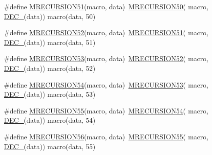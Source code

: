 \begin{DoxyCompactItemize}
\item 
\#define \mbox{\hyperlink{group__group__sam0__utils__mrecursion_ga6e7ba2940484a6723ca0f5a6c844ba89}{M\+R\+E\+C\+U\+R\+S\+I\+O\+N51}}(macro,  data)~\mbox{\hyperlink{group__group__sam0__utils__mrecursion_gadda406cbee1fde1ebddb8671c858981c}{M\+R\+E\+C\+U\+R\+S\+I\+O\+N50}}(  macro, \mbox{\hyperlink{group__group__sam0__utils__mrecursion_ga1d23d683797679dca8c3512a54a5dcae}{D\+E\+C\+\_\+}}(data))   macro(data, 50)
\item 
\#define \mbox{\hyperlink{group__group__sam0__utils__mrecursion_ga168834cb335f274f04d497f16f7b3289}{M\+R\+E\+C\+U\+R\+S\+I\+O\+N52}}(macro,  data)~\mbox{\hyperlink{group__group__sam0__utils__mrecursion_ga6e7ba2940484a6723ca0f5a6c844ba89}{M\+R\+E\+C\+U\+R\+S\+I\+O\+N51}}(  macro, \mbox{\hyperlink{group__group__sam0__utils__mrecursion_ga1d23d683797679dca8c3512a54a5dcae}{D\+E\+C\+\_\+}}(data))   macro(data, 51)
\item 
\#define \mbox{\hyperlink{group__group__sam0__utils__mrecursion_ga3ae2341c96ce8ddf34769207f469c5e6}{M\+R\+E\+C\+U\+R\+S\+I\+O\+N53}}(macro,  data)~\mbox{\hyperlink{group__group__sam0__utils__mrecursion_ga168834cb335f274f04d497f16f7b3289}{M\+R\+E\+C\+U\+R\+S\+I\+O\+N52}}(  macro, \mbox{\hyperlink{group__group__sam0__utils__mrecursion_ga1d23d683797679dca8c3512a54a5dcae}{D\+E\+C\+\_\+}}(data))   macro(data, 52)
\item 
\#define \mbox{\hyperlink{group__group__sam0__utils__mrecursion_ga1b859acc9e5724f34b432b236b8fd422}{M\+R\+E\+C\+U\+R\+S\+I\+O\+N54}}(macro,  data)~\mbox{\hyperlink{group__group__sam0__utils__mrecursion_ga3ae2341c96ce8ddf34769207f469c5e6}{M\+R\+E\+C\+U\+R\+S\+I\+O\+N53}}(  macro, \mbox{\hyperlink{group__group__sam0__utils__mrecursion_ga1d23d683797679dca8c3512a54a5dcae}{D\+E\+C\+\_\+}}(data))   macro(data, 53)
\item 
\#define \mbox{\hyperlink{group__group__sam0__utils__mrecursion_ga9ebaa5b7ac45c089517951e6978ee88a}{M\+R\+E\+C\+U\+R\+S\+I\+O\+N55}}(macro,  data)~\mbox{\hyperlink{group__group__sam0__utils__mrecursion_ga1b859acc9e5724f34b432b236b8fd422}{M\+R\+E\+C\+U\+R\+S\+I\+O\+N54}}(  macro, \mbox{\hyperlink{group__group__sam0__utils__mrecursion_ga1d23d683797679dca8c3512a54a5dcae}{D\+E\+C\+\_\+}}(data))   macro(data, 54)
\item 
\#define \mbox{\hyperlink{group__group__sam0__utils__mrecursion_ga1899efaf30176f2ad8b7b1e22b2564c5}{M\+R\+E\+C\+U\+R\+S\+I\+O\+N56}}(macro,  data)~\mbox{\hyperlink{group__group__sam0__utils__mrecursion_ga9ebaa5b7ac45c089517951e6978ee88a}{M\+R\+E\+C\+U\+R\+S\+I\+O\+N55}}(  macro, \mbox{\hyperlink{group__group__sam0__utils__mrecursion_ga1d23d683797679dca8c3512a54a5dcae}{D\+E\+C\+\_\+}}(data))   macro(data, 55)

\end{DoxyCompactItemize}
